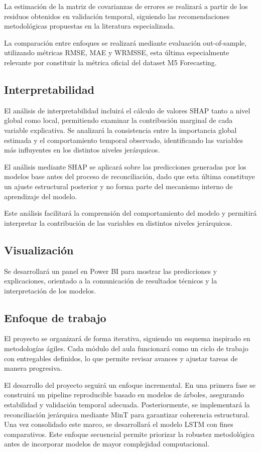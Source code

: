 \documentclass[IB,BIB]{TFUOC}%
\begin{document}
La estimación de la matriz de covarianzas de errores se realizará a
partir de los residuos obtenidos en validación temporal, siguiendo las
recomendaciones metodológicas propuestas en la literatura especializada.

La comparación entre enfoques se realizará mediante evaluación
out-of-sample, utilizando métricas RMSE, MAE y WRMSSE, esta última
especialmente relevante por constituir la métrica oficial del dataset M5
Forecasting.

\subsection{Interpretabilidad}

El análisis de interpretabilidad incluirá el cálculo de valores SHAP
tanto a nivel global como local, permitiendo examinar la contribución
marginal de cada variable explicativa. Se analizará la consistencia
entre la importancia global estimada y el comportamiento temporal
observado, identificando las variables más influyentes en los distintos
niveles jerárquicos.

El análisis mediante SHAP se aplicará sobre las predicciones generadas
por los modelos base antes del proceso de reconciliación, dado que esta
última constituye un ajuste estructural posterior y no forma parte del
mecanismo interno de aprendizaje del modelo.

Este análisis facilitará la comprensión del comportamiento del modelo y
permitirá interpretar la contribución de las variables en distintos
niveles jerárquicos.

\subsection{Visualización}

Se desarrollará un panel en Power BI para mostrar las predicciones y
explicaciones, orientado a la comunicación de resultados técnicos y la
interpretación de los modelos.

\subsection{Enfoque de trabajo}
El proyecto se organizará de forma iterativa, siguiendo un esquema
inspirado en metodologías ágiles. Cada módulo del aula funcionará como
un ciclo de trabajo con entregables definidos, lo que permite revisar
avances y ajustar tareas de manera progresiva.

El desarrollo del proyecto seguirá un enfoque incremental. En una
primera fase se construirá un pipeline reproducible basado en modelos de
árboles, asegurando estabilidad y validación temporal adecuada.
Posteriormente, se implementará la reconciliación jerárquica mediante
MinT para garantizar coherencia estructural. Una vez consolidado este
marco, se desarrollará el modelo LSTM con fines comparativos. Este
enfoque secuencial permite priorizar la robustez metodológica antes de
incorporar modelos de mayor complejidad computacional.
\end{document}
